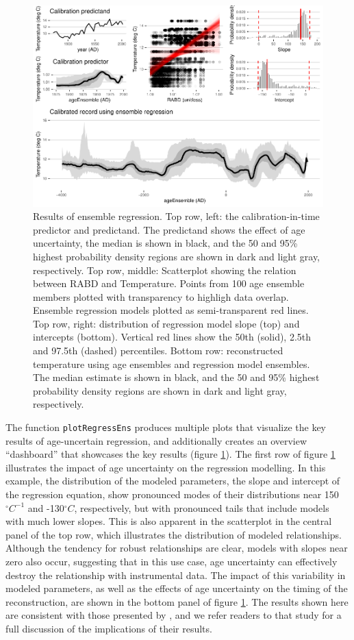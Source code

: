 \documentclass[gchron, manuscript]{copernicus}
\begin{document}
\begin{figure}
\includegraphics[width=12cm]{geoChronR-paper_files/figure-latex/regression-1} \caption{Results of ensemble regression. Top row, left: the calibration-in-time predictor and predictand. The predictand shows the effect of age uncertainty, the median is shown in black, and the 50 and 95\% highest probability density regions are shown in dark and light gray, respectively. Top row, middle: Scatterplot showing the relation between RABD and Temperature. Points from 100 age ensemble members plotted with transparency to highligh data overlap. Ensemble regression models plotted as semi-transparent red lines. Top row, right: distribution of regression model slope (top) and intercepts (bottom). Vertical red lines show the 50th (solid), 2.5th and 97.5th (dashed) percentiles. Bottom row: reconstructed temperature using age ensembles and regression model ensembles. The median estimate is shown in black, and the 50 and 95\% highest probability density regions are shown in dark and light gray, respectively.}\label{fig:regression}
\end{figure}

The function \texttt{plotRegressEns} produces multiple plots that visualize the key results of age-uncertain regression, and additionally creates an overview ``dashboard'' that showcases the key results (figure \ref{fig:regression}).
The first row of figure \ref{fig:regression} illustrates the impact of age uncertainty on the regression modelling.
In this example, the distribution of the modeled parameters, the slope and intercept of the regression equation, show pronounced modes of their distributions near 150\(^\circ C^{-1}\) and -130\(^\circ C\), respectively, but with pronounced tails that include models with much lower slopes.
This is also apparent in the scatterplot in the central panel of the top row, which illustrates the distribution of modeled relationships.
Although the tendency for robust relationships are clear, models with slopes near zero also occur, suggesting that in this use case, age uncertainty can effectively destroy the relationship with instrumental data.
The impact of this variability in modeled parameters, as well as the effects of age uncertainty on the timing of the reconstruction, are shown in the bottom panel of figure \ref{fig:regression}.
The results shown here are consistent with those presented by \citet{Boldt2015}, and we refer readers to that study for a full discussion of the implications of their results.
\end{document}
